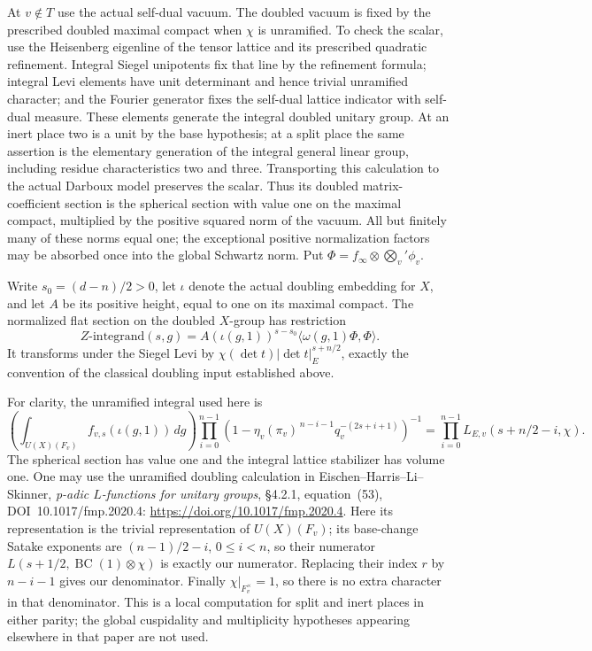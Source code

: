 At \(v\notin T\) use the actual self-dual vacuum.
The doubled vacuum is fixed by the prescribed doubled
maximal compact when \(\chi\) is unramified. To check the
scalar, use the Heisenberg eigenline of the tensor lattice
and its prescribed quadratic refinement. Integral Siegel
unipotents fix that line by the refinement formula; integral
Levi elements have unit determinant and hence trivial
unramified character; and the Fourier generator fixes the
self-dual lattice indicator with self-dual measure.
These elements generate the integral doubled unitary group.
At an inert place two is a unit by the base hypothesis;
at a split place the same assertion is the elementary
generation of the integral general linear group, including
residue characteristics two and three.
Transporting this calculation to the actual Darboux model
preserves the scalar. Thus its doubled matrix-coefficient
section is the spherical section with value one on the
maximal compact, multiplied by the positive squared norm
of the vacuum. All but finitely many of these norms equal
one; the exceptional positive normalization factors may
be absorbed once into the global Schwartz norm. Put
\(\Phi=f_\infty\otimes\bigotimes_v'\phi_v\).

Write \(s_0=(d-n)/2>0\), let \(\iota\) denote the actual
doubling embedding for \(X\), and let \(A\) be its positive
height, equal to one on its maximal compact. The normalized
flat section on the doubled \(X\)-group has restriction
\[
 Z\text{-integrand}(s,g)=
 A(\iota(g,1))^{s-s_0}
           \langle\omega(g,1)\Phi,\Phi\rangle.
\]
It transforms under the Siegel Levi by
\(\chi(\det t)|\det t|_E^{s+n/2}\), exactly the convention
of the classical doubling input established above.

For clarity, the unramified integral used here is
\[
 \left(\int_{U(X)(F_v)}
             f_{v,s}(\iota(g,1))\,dg\right)
 \prod_{i=0}^{n-1}
       (1-\eta_v(\pi_v)^{\,n-i-1}
                         q_v^{-(2s+i+1)})^{-1}
       =\prod_{i=0}^{n-1}
                     L_{E,v}(s+n/2-i,\chi).
\tag{***}\label{eq:sr-base-unramified-zeta}
\]
The spherical section has value one and the integral lattice
stabilizer has volume one. One may use the unramified
doubling calculation in Eischen--Harris--Li--Skinner,
\emph{p-adic \(L\)-functions for unitary groups},
\S4.2.1, equation~(53), DOI~10.1017/fmp.2020.4:
\url{https://doi.org/10.1017/fmp.2020.4}.
Here its representation is the trivial representation of
\(U(X)(F_v)\); its base-change Satake exponents are
\((n-1)/2-i\), \(0\leq i<n\), so their numerator
\(L(s+1/2,\operatorname{BC}(1)\otimes\chi)\) is exactly
our numerator. Replacing their index \(r\) by \(n-i-1\)
gives our denominator. Finally \(\chi|_{F_v^\times}=1\),
so there is no extra character in that denominator.
This is a local computation for split and inert places in
either parity; the global cuspidality and multiplicity
hypotheses appearing elsewhere in that paper are not used.

